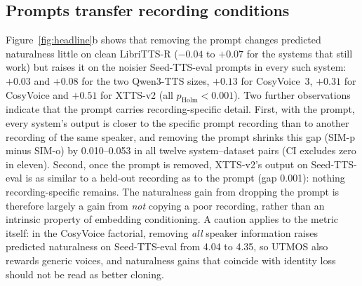 \documentclass{Interspeech}
\begin{document}
\begin{table}[t]
\centering
\caption{CosyVoice embedding-site factorial: SIM-o (speaker-level means) for each combination of prompt, language-model (LM) and decoder (flow) embedding. LibriTTS-R: 34 speakers $\times$ 5 targets $\times$ 3 seeds; Seed-TTS-eval: 300 items. Differences from the all-on cell within each prompt condition are significant at $p{<}10^{-8}$ unless marked n.s.}
\label{tab:factorial}
\small
\setlength{\tabcolsep}{4pt}
\end{table}

\subsection{Prompts transfer recording conditions}
\label{sec:recording}

Figure~\ref{fig:headline}b shows that removing the prompt changes predicted naturalness little on clean LibriTTS-R ($-0.04$ to $+0.07$ for the systems that still work) but raises it on the noisier Seed-TTS-eval prompts in every such system: $+0.03$ and $+0.08$ for the two Qwen3-TTS sizes, $+0.13$ for CosyVoice~3, $+0.31$ for CosyVoice and $+0.51$ for XTTS-v2 (all $p_\text{Holm}{<}0.001$).
Two further observations indicate that the prompt carries recording-specific detail.
First, with the prompt, every system's output is closer to the specific prompt recording than to another recording of the same speaker, and removing the prompt shrinks this gap (SIM-p minus SIM-o) by 0.010--0.053 in all twelve system--dataset pairs (CI excludes zero in eleven).
Second, once the prompt is removed, XTTS-v2's output on Seed-TTS-eval is as similar to a held-out recording as to the prompt (gap 0.001): nothing recording-specific remains.
The naturalness gain from dropping the prompt is therefore largely a gain from \emph{not} copying a poor recording, rather than an intrinsic property of embedding conditioning.
A caution applies to the metric itself: in the CosyVoice factorial, removing \emph{all} speaker information raises predicted naturalness on Seed-TTS-eval from 4.04 to 4.35, so UTMOS also rewards generic voices, and naturalness gains that coincide with identity loss should not be read as better cloning.
\end{document}
